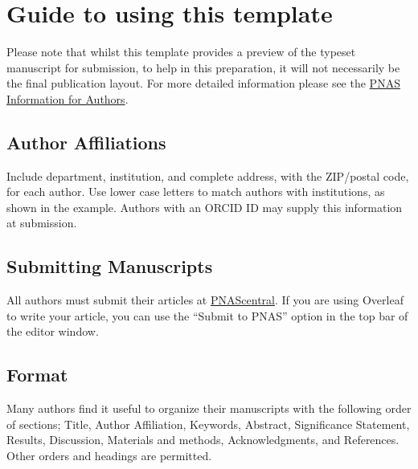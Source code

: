 \documentclass[9pt,twocolumn,twoside,]{pnas-new}
\begin{document}
\hypertarget{guide-to-using-this-template}{%
\section*{Guide to using this
template}\label{guide-to-using-this-template}}

Please note that whilst this template provides a preview of the typeset
manuscript for submission, to help in this preparation, it will not
necessarily be the final publication layout. For more detailed
information please see the
\href{http://www.pnas.org/site/authors/format.xhtml}{PNAS Information
for Authors}.

\hypertarget{author-affiliations}{%
\subsection*{Author Affiliations}\label{author-affiliations}}

Include department, institution, and complete address, with the
ZIP/postal code, for each author. Use lower case letters to match
authors with institutions, as shown in the example. Authors with an
ORCID ID may supply this information at submission.

\hypertarget{submitting-manuscripts}{%
\subsection*{Submitting Manuscripts}\label{submitting-manuscripts}}

All authors must submit their articles at
\href{http://www.pnascentral.org/cgi-bin/main.plex}{PNAScentral}. If you
are using Overleaf to write your article, you can use the ``Submit to
PNAS'' option in the top bar of the editor window.

\hypertarget{format}{%
\subsection*{Format}\label{format}}

Many authors find it useful to organize their manuscripts with the
following order of sections; Title, Author Affiliation, Keywords,
Abstract, Significance Statement, Results, Discussion, Materials and
methods, Acknowledgments, and References. Other orders and headings are
permitted.
\end{document}
